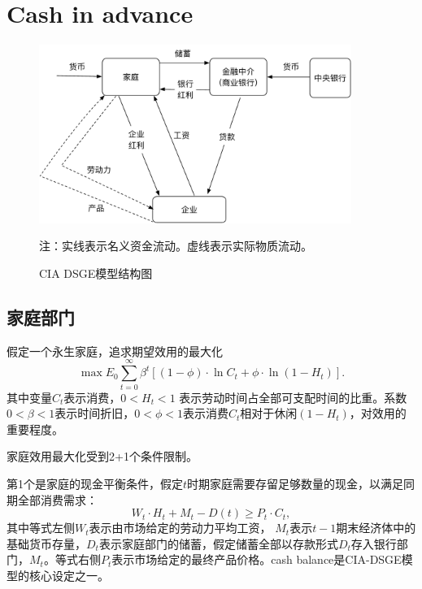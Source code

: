 \chapter{Cash in advance}
\label{sec:DSGECIA-intro}
\begin{figure}[htbp]
  \centering
  \includegraphics[width=4in]{./Figures/20170324-CIA-outline}
 \caption{CIA DSGE模型结构图}
\label{fig:CIA-blueprint}

  \small{注：实线表示名义资金流动。虚线表示实际物质流动。}
\end{figure}

\section{家庭部门}
假定一个永生家庭，追求期望效用的最大化
\begin{equation}
  \label{eq:CIA-hh-max-util}
  \max%
  E_0 \sum_{t=0}^{\infty} \beta^t \left[ (1-\phi) \cdot \ln C_t + \phi \cdot \ln (1-H_t)\right].
\end{equation}
其中变量$ C_t$表示消费，$0<H_t<1$ 表示劳动时间占全部可支配时间的比重。系数$0<\beta<1$表示时间折旧，$0< \phi <1$表示消费$C_t$相对于休闲$(1-H_t)$，对效用的重要程度。

家庭效用最大化受到2+1个条件限制。

第1个是家庭的现金平衡条件，假定$t$时期家庭需要存留足够数量的现金，以满足同期全部消费需求：
\begin{equation}
  \label{eq:CIA-hh-cash-balance}
  W_t \cdot H_t + M_t - D(t) \ge P_t \cdot C_t,
\end{equation}
其中等式左侧$W_t$表示由市场给定的劳动力平均工资，%
$M_t$表示$t-1$期末经济体中的基础货币存量，$D_t$表示家庭部门的储蓄，假定储蓄全部以存款形式$D_t$存入银行部门，$M_t$。等式右侧$P_t$表示市场给定的最终产品价格。cash balance是CIA-DSGE模型的核心设定之一。

